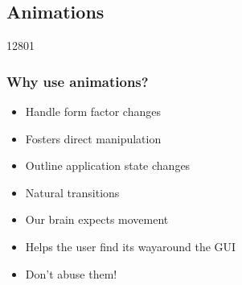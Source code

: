 %
%
%
%

\subsection{Animations}
\begin{slide}{12801}\frametitle{Why use animations?}
\label{animations-showcase}

\begin{itemize}
\item Handle form factor changes
\item Fosters direct manipulation
\item Outline application state changes
\item Natural transitions
\item Our brain expects movement
\item Helps the user find its way\linebreak around the GUI
\item Don't abuse them!
\end{itemize}

\vspace*{2em}
\end{slide}


